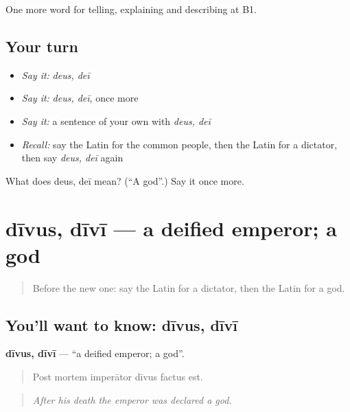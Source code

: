 \begin{grammarlens}[title={What you've built}]
One more word for telling, explaining and describing at B1.
\end{grammarlens}

\subsection*{Your turn}
\begin{itemize}
\raggedright
  \item \emph{Say it:} \emph{deus, deī}
  \item \emph{Say it:} \emph{deus, deī}, once more
  \item \emph{Say it:} a sentence of your own with \emph{deus, deī}
  \item \emph{Recall:} say the Latin for the common people, then the Latin for a dictator, then say \emph{deus, deī} again
\end{itemize}

\begin{tcolorbox}[breakable,colback=teal!4,colframe=teal!35!black,title={Before you move on}]
What does deus, deī mean? (\textquotedblleft{}A god\textquotedblright{}.) Say it once more.
\end{tcolorbox}
\section[dīvus, dīvī]{dīvus, dīvī — a deified emperor; a god}

\label{lesson:LA-C346-divus}



\begin{quote}
Before the new one: say the Latin for a dictator, then the Latin for a god.
\end{quote}

\subsection*{You'll want to know: dīvus, dīvī}
\textbf{dīvus, dīvī} — \textquotedblleft{}a deified emperor; a god\textquotedblright{}.

\begin{quote}
Post mortem imperātor dīvus factus est.
\end{quote}

\begin{quote}
\emph{After his death the emperor was declared a god.}
\end{quote}

